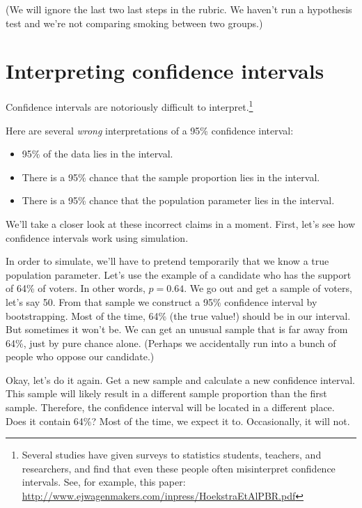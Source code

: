 \documentclass[
]{book}
\begin{document}
(We will ignore the last two last steps in the rubric. We haven't run a hypothesis test and we're not comparing smoking between two groups.)

\hypertarget{ci-interpret}{%
\section{Interpreting confidence intervals}\label{ci-interpret}}

Confidence intervals are notoriously difficult to interpret.\footnote{Several studies have given surveys to statistics students, teachers, and researchers, and find that even these people often misinterpret confidence intervals. See, for example, this paper: \url{http://www.ejwagenmakers.com/inpress/HoekstraEtAlPBR.pdf}}

Here are several \emph{wrong} interpretations of a 95\% confidence interval:

\begin{itemize}
\item
  95\% of the data lies in the interval.
\item
  There is a 95\% chance that the sample proportion lies in the interval.
\item
  There is a 95\% chance that the population parameter lies in the interval.
\end{itemize}

We'll take a closer look at these incorrect claims in a moment. First, let's see how confidence intervals work using simulation.

In order to simulate, we'll have to pretend temporarily that we know a true population parameter. Let's use the example of a candidate who has the support of 64\% of voters. In other words, \(p = 0.64\). We go out and get a sample of voters, let's say 50. From that sample we construct a 95\% confidence interval by bootstrapping. Most of the time, 64\% (the true value!) should be in our interval. But sometimes it won't be. We can get an unusual sample that is far away from 64\%, just by pure chance alone. (Perhaps we accidentally run into a bunch of people who oppose our candidate.)

Okay, let's do it again. Get a new sample and calculate a new confidence interval. This sample will likely result in a different sample proportion than the first sample. Therefore, the confidence interval will be located in a different place. Does it contain 64\%? Most of the time, we expect it to. Occasionally, it will not.
\end{document}

